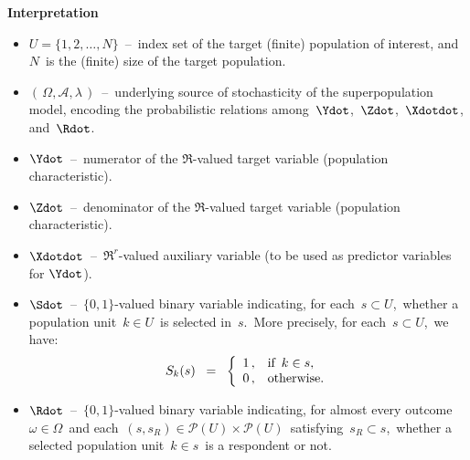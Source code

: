 \vskip 0.2cm
\noindent
\textbf{Interpretation}
\begin{itemize}
\item
    $U = \{1,2,\ldots,N\}$
    \,--\,
    index set of the target (finite) population of interest,
    and \,$N$\, is the (finite) size of the target population.
\item
    $\left(\,\Omega,\mathscr{A},\lambda\,\right)$
    \,--\,
    underlying source of stochasticity of the superpopulation model,
    encoding the probabilistic relations among
    \,$\Ydot$,\, $\Zdot$,\, $\Xdotdot$,\, and \,$\Rdot$.\,
\item
    $\Ydot$
    \,--\,
    numerator of the $\Re$-valued target variable (population characteristic).
\item
    $\Zdot$
    \,--\,
    denominator of the $\Re$-valued target variable (population characteristic).
\item
    $\Xdotdot$
    \,--\,
    $\Re^{r}$-valued auxiliary variable (to be used as predictor variables for $\Ydot$).
\item
    $\Sdot$
    \,--\,
    $\{0,1\}$-valued binary variable indicating, for each \,$s \subset U$,\,
    whether a population unit \,$k \in U$\, is selected in \,$s$.\,
    More precisely, for each \,$s \subset U$,\, we have:
    \begin{equation*}
    S_{k}(s)
    \;\; = \;\;
        \left\{\begin{array}{cl}
            1\,, & \textnormal{if \,$k \in s$},
            \\
            0\,, & \textnormal{otherwise}.
            \end{array}\right.
    \end{equation*}
\item
    $\Rdot$
    \,--\,
    $\{0,1\}$-valued binary variable indicating, for almost every outcome
    \,$\omega \in \Omega$\,
    and each
    \,$(s,s_{R}) \in \mathcal{P}(U) \times \mathcal{P}(U)$\,
    satisfying
    \,$s_{R} \subset s$,\,
    whether a selected population unit \,$ k \in s$\,
    is a respondent or not.
\end{itemize}

